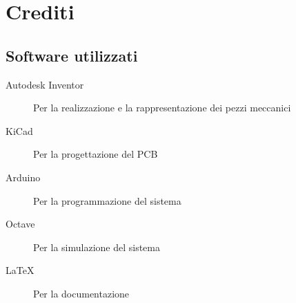 \documentclass{report}
\begin{document}
\chapter{Crediti}
\section{Software utilizzati}
\begin{description}
\item[Autodesk Inventor]Per la realizzazione e la rappresentazione dei pezzi meccanici
\item[KiCad]Per la progettazione del PCB
\item[Arduino]Per la programmazione del sistema
\item[Octave]Per la simulazione del sistema
\item[\LaTeX]Per la documentazione
\end{description}




\end{document}

